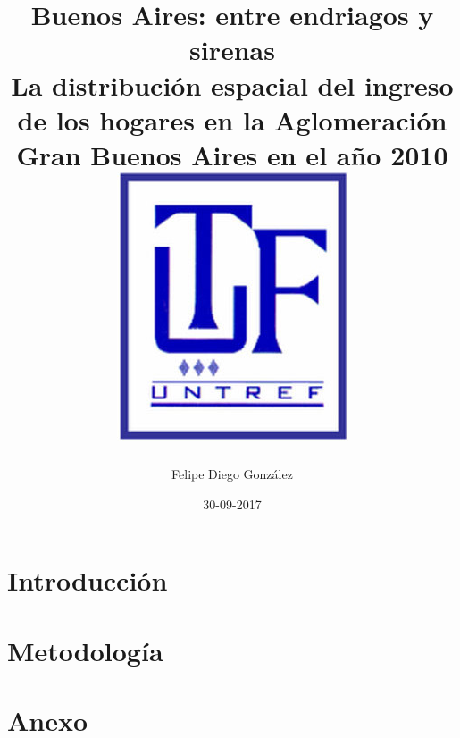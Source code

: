 \documentclass{report}
\title{
	{Buenos Aires: entre endriagos y sirenas}\\
	{\large La distribución espacial del ingreso de los hogares en la Aglomeración Gran Buenos Aires en el año 2010}\\
	{\includegraphics{untrefLogo.jpg}}
}
\author{Felipe Diego González}
\date{30-09-2017}
\begin{document}
  	\maketitle
  	
  	\tableofcontents
  	
  	\chapter{Introducción}
  	

  	\chapter{Metodología}
  	

  	\chapter{Anexo}
  		  
  		
	
  		
  	 
  		
  	  	  
  	
  
\end{document}
